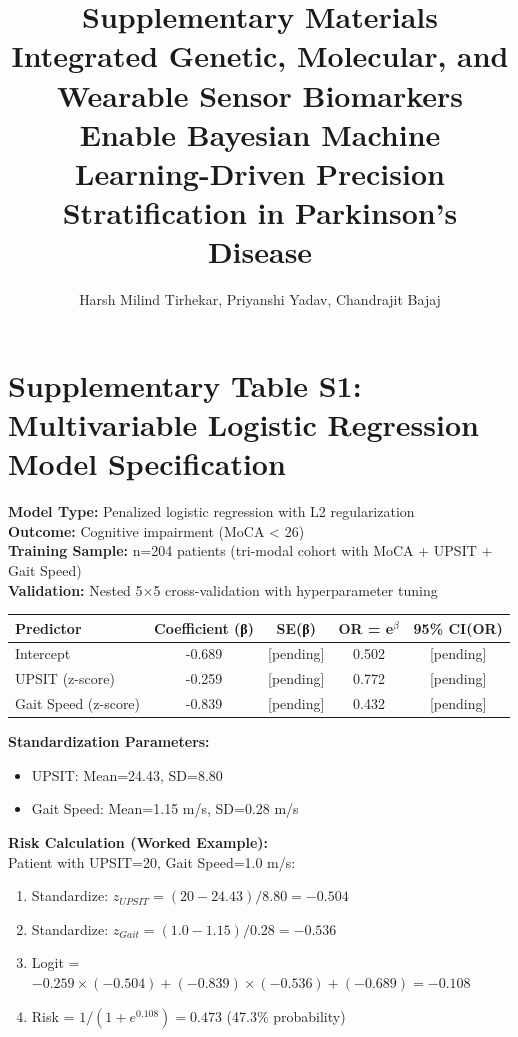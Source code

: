 \documentclass[11pt]{article}
\title{Supplementary Materials\\
\large{Integrated Genetic, Molecular, and Wearable Sensor Biomarkers Enable Bayesian Machine Learning-Driven Precision Stratification in Parkinson's Disease}}
\author{Harsh Milind Tirhekar, Priyanshi Yadav, Chandrajit Bajaj}
\date{}
\begin{document}
\maketitle

\section*{Supplementary Table S1: Multivariable Logistic Regression Model Specification}

\textbf{Model Type:} Penalized logistic regression with L2 regularization\\
\textbf{Outcome:} Cognitive impairment (MoCA < 26)\\
\textbf{Training Sample:} n=204 patients (tri-modal cohort with MoCA + UPSIT + Gait Speed)\\
\textbf{Validation:} Nested 5×5 cross-validation with hyperparameter tuning

\begin{table}[ht]
\centering
\begin{tabular}{lcccc}
\toprule
\textbf{Predictor} & \textbf{Coefficient (β)} & \textbf{SE(β)} & \textbf{OR = e}$^β$ & \textbf{95\% CI(OR)} \\
\midrule
Intercept & -0.689 & [pending] & 0.502 & [pending] \\
UPSIT (z-score) & -0.259 & [pending] & 0.772 & [pending] \\
Gait Speed (z-score) & -0.839 & [pending] & 0.432 & [pending] \\
\bottomrule
\end{tabular}
\end{table}

\textbf{Standardization Parameters:}
\begin{itemize}
\item UPSIT: Mean=24.43, SD=8.80
\item Gait Speed: Mean=1.15 m/s, SD=0.28 m/s
\end{itemize}

\textbf{Risk Calculation (Worked Example):}\\
Patient with UPSIT=20, Gait Speed=1.0 m/s:

\begin{enumerate}
\item Standardize: $z_{UPSIT} = (20-24.43)/8.80 = -0.504$
\item Standardize: $z_{Gait} = (1.0-1.15)/0.28 = -0.536$
\item Logit = $-0.259×(-0.504) + (-0.839)×(-0.536) + (-0.689) = -0.108$
\item Risk = $1/(1+e^{0.108}) = 0.473$ (47.3\% probability)
\end{enumerate}
\end{document}
